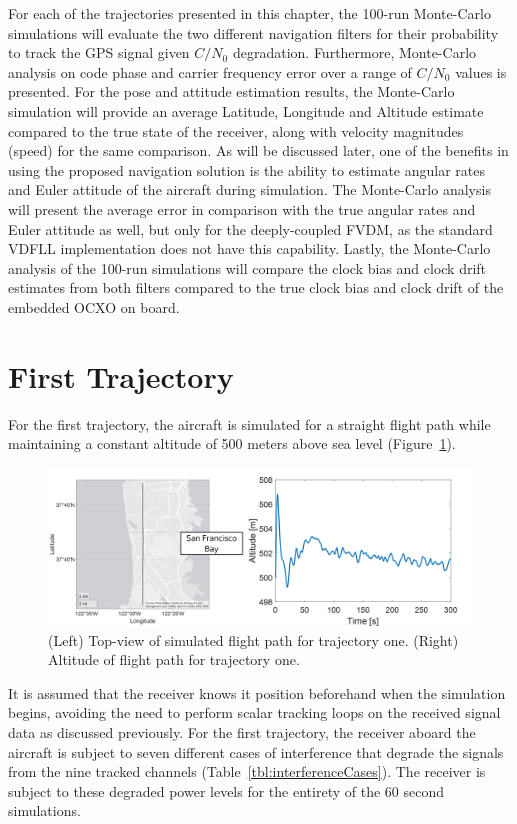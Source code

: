 For each of the trajectories presented in this chapter, the 100-run Monte-Carlo simulations will evaluate the two different navigation filters for their probability to track the GPS signal given \(C/N_0\) degradation. Furthermore, Monte-Carlo analysis on code phase and carrier frequency error over a range of \(C/N_0\) values is presented. For the pose and attitude estimation results, the Monte-Carlo simulation will provide an average Latitude, Longitude and Altitude estimate compared to the true state of the receiver, along with velocity magnitudes (speed) for the same comparison. As will be discussed later, one of the benefits in using the proposed navigation solution is the ability to estimate angular rates and Euler attitude of the aircraft during simulation. The Monte-Carlo analysis will present the average error in comparison with the true angular rates and Euler attitude as well, but only for the deeply-coupled FVDM, as the standard VDFLL implementation does not have this capability. Lastly, the Monte-Carlo analysis of the 100-run simulations will compare the clock bias and clock drift estimates from both filters compared to the true clock bias and clock drift of the embedded OCXO on board.


\section{\textbf{First Trajectory}}
For the first trajectory, the aircraft is simulated for a straight flight path while maintaining a constant altitude of 500 meters above sea level (Figure~\ref{fig:trajectory1}).

\begin{figure}[!ht]
    \centering
    \includegraphics[width=0.9\linewidth]{Figures/Results/trajectory1.png}
    \caption{(Left) Top-view of simulated flight path for trajectory one. (Right) Altitude of flight path for trajectory one.}\label{fig:trajectory1}
\end{figure}

It is assumed that the receiver knows it position beforehand when the simulation begins, avoiding the need to perform scalar tracking loops on the received signal data as discussed previously. For the first trajectory, the receiver aboard the aircraft is subject to seven different cases of interference that degrade the signals from the nine tracked channels (Table~\ref{tbl:interferenceCases}). The receiver is subject to these degraded power levels for the entirety of the 60 second simulations.

